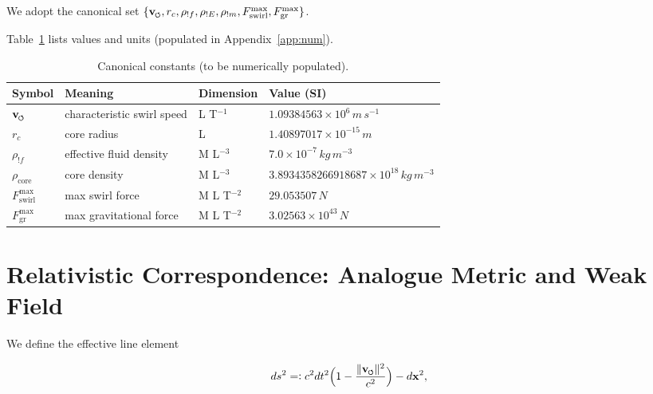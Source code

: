 \documentclass[11pt,a4paper]{article}
\newcommand{\swirlarrow}{\mathchoice{\mkern-2mu\scriptstyle\boldsymbol{\circlearrowleft}}{\mkern-2mu\scriptstyle\boldsymbol{\circlearrowleft}}{\mkern-2mu\scriptscriptstyle\boldsymbol{\circlearrowleft}}{\mkern-2mu\scriptscriptstyle\boldsymbol{\circlearrowleft}}}
\newcommand{\vswirl}{\mathbf{v}_{\swirlarrow}} %
\newcommand{\rc}{r_c}                                      %
\newcommand{\rhoF}{\rho_{!f}}                            %
\newcommand{\rhoE}{\rho_{!E}}                            %
\newcommand{\rhoM}{\rho_{!m}}                            %
\newcommand{\defeq}{=\vcentcolon}     %
\newcommand{\FmaxSwirl}{F_{\text{swirl}}^{\max}}
\newcommand{\FmaxGr}{F_{\text{gr}}^{\max}}
\begin{document}

We adopt the canonical set $\{\vswirl,\rc,\rhoF,\rhoE,\rhoM,\FmaxSwirl,\FmaxGr\}$.

Table~\ref{tab:constants} lists values and units (populated in Appendix~\ref{app:num}).


\begin{table}[h]

\centering

\caption{Canonical constants (to be numerically populated).}

\label{tab:constants}

\begin{tabular}{@{}llll@{}}
\toprule
Symbol & Meaning & Dimension & Value (SI) \\
\midrule
$\vswirl$ & characteristic swirl speed & L T$^{-1}$ & $1.09384563\times10^6\,\si{m\,s^{-1}}$ \\
$\rc$ & core radius & L & $1.40897017\times10^{-15}\,\si{m}$ \\
$\rhoF$ & effective fluid density & M L$^{-3}$ & $7.0\times10^{-7}\,\si{kg\,m^{-3}}$ \\
$\rho_{\text{core}}$ & core density & M L$^{-3}$ & $3.8934358266918687\times10^{18}\,\si{kg\,m^{-3}}$ \\
$\FmaxSwirl$ & max swirl force & M L T$^{-2}$ & $29.053507\,\si{N}$ \\
$\FmaxGr$ & max gravitational force & M L T$^{-2}$ & $3.02563\times10^{43}\,\si{N}$ \\
\bottomrule
\end{tabular}

\end{table}



\section{Relativistic Correspondence: Analogue Metric and Weak Field}

\label{sec:relativistic}

We define the effective line element

\begin{equation}

ds^2 \defeq c^2 dt^2\Big(1-\frac{\lVert\vswirl\rVert^2}{c^2}\Big) - d\mathbf x^2,

\label{eq:metric}

\end{equation}
\end{document}
